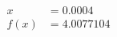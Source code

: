 \documentclass[preview]{standalone}
\begin{document}
\begin{align*}
x &= 0.0004\\f(x) &= 4.0077104
\end{align*}
\end{document}
